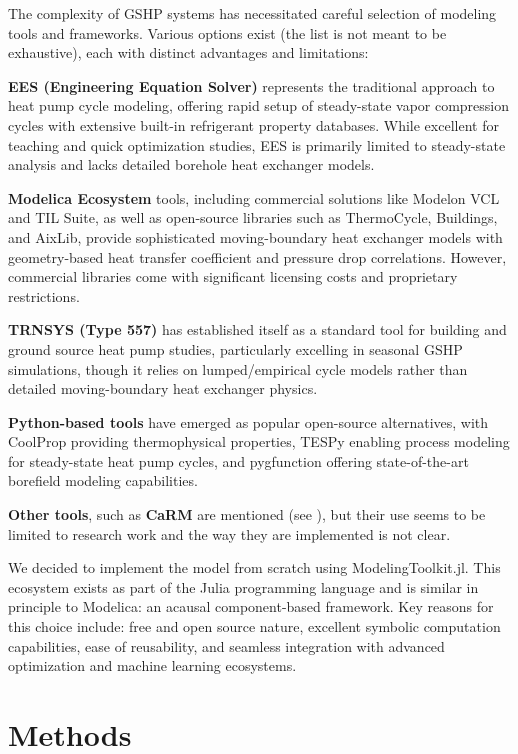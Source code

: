 \documentclass[journal=iecr,manuscript=]{achemso}
\begin{document}
The complexity of GSHP systems has necessitated careful selection of
modeling tools and frameworks. Various options exist (the list is not
meant to be exhaustive), each with distinct advantages and limitations:

\textbf{EES (Engineering Equation Solver)} represents the traditional
approach to heat pump cycle modeling, offering rapid setup of
steady-state vapor compression cycles with extensive built-in
refrigerant property databases. While excellent for teaching and quick
optimization studies, EES is primarily limited to steady-state analysis
and lacks detailed borehole heat exchanger models.

\textbf{Modelica Ecosystem} tools, including commercial solutions like
Modelon VCL and TIL Suite, as well as open-source libraries such as
ThermoCycle, Buildings, and AixLib, provide sophisticated
moving-boundary heat exchanger models with geometry-based heat transfer
coefficient and pressure drop correlations. However, commercial
libraries come with significant licensing costs and proprietary
restrictions.

\textbf{TRNSYS (Type 557)} has established itself as a standard tool for
building and ground source heat pump studies, particularly excelling in
seasonal GSHP simulations, though it relies on lumped/empirical cycle
models rather than detailed moving-boundary heat exchanger physics.

\textbf{Python-based tools} have emerged as popular open-source
alternatives, with CoolProp providing thermophysical properties, TESPy
enabling process modeling for steady-state heat pump cycles, and
pygfunction offering state-of-the-art borefield modeling capabilities.

\textbf{Other tools}, such as \textbf{CaRM} are mentioned (see
\citet{zarrella2016simulation}), but their use seems to be limited to
research work and the way they are implemented is not clear.

We decided to implement the model from scratch using ModelingToolkit.jl.
This ecosystem exists as part of the Julia programming language and is
similar in principle to Modelica: an acausal component-based framework.
Key reasons for this choice include: free and open source nature,
excellent symbolic computation capabilities, ease of reusability, and
seamless integration with advanced optimization and machine learning
ecosystems.

\section{Methods}\label{methods}
\end{document}
